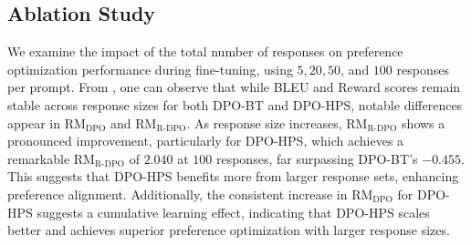 \subsection{Ablation Study}
\vspace{-3pt}
We examine the impact of the total number of responses on preference optimization performance during fine-tuning, using $5, 20, 50$, and $100$ responses per prompt. From , one can observe that while BLEU and Reward scores remain stable across response sizes for both DPO-BT and DPO-HPS, notable differences appear in $\text{RM}_{\text{DPO}}$ and $\text{RM}_{\text{R-DPO}}$. As response size increases, $\text{RM}_{\text{R-DPO}}$ shows a pronounced improvement, particularly for DPO-HPS, which achieves a remarkable $\text{RM}_{\text{R-DPO}}$ of $2.040$ at $100$ responses, far surpassing DPO-BT's $-0.455$. This suggests that DPO-HPS benefits more from larger response sets, enhancing preference alignment. Additionally, the consistent increase in $\text{RM}_{\text{DPO}}$ for DPO-HPS suggests a cumulative learning effect, indicating that DPO-HPS scales better and achieves superior preference optimization with larger response sizes.




%
